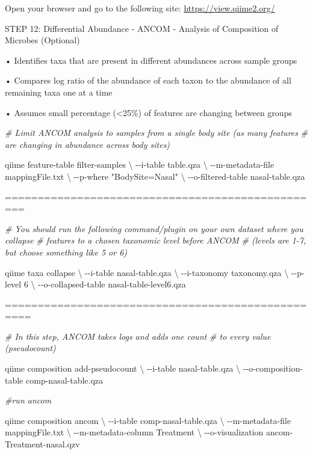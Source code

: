 \documentclass[
]{book}
\newenvironment{Shaded}{\begin{snugshade}}{\end{snugshade}}
\newcommand{\CommentTok}[1]{\textcolor[rgb]{0.56,0.35,0.01}{\textit{#1}}}
\newcommand{\DataTypeTok}[1]{\textcolor[rgb]{0.13,0.29,0.53}{#1}}
\newcommand{\ExtensionTok}[1]{#1}
\newcommand{\NormalTok}[1]{#1}
\newcommand{\StringTok}[1]{\textcolor[rgb]{0.31,0.60,0.02}{#1}}
\begin{document}
Open your browser and go to the following site:
\url{https://view.qiime2.org/}

STEP 12: Differential Abundance - ANCOM - Analysis of Composition of Microbes (Optional)

• Identifies taxa that are present in different abundances across sample groups

• Compares log ratio of the abundance of each taxon to the abundance of all remaining taxa one at a time

• Assumes small percentage (\textless25\%) of features are changing between groups

\begin{Shaded}
\begin{Highlighting}[]
\CommentTok{\# Limit ANCOM analysis to samples from a single body site (as many features }
\CommentTok{\# are changing in abundance across body sites)}

\ExtensionTok{qiime}\NormalTok{ feature{-}table filter{-}samples }\DataTypeTok{\textbackslash{}}
\NormalTok{{-}{-}i{-}table table.qza }\DataTypeTok{\textbackslash{}}
\NormalTok{{-}{-}m{-}metadata{-}file mappingFile.txt }\DataTypeTok{\textbackslash{}}
\NormalTok{{-}{-}p{-}where }\StringTok{"BodySite=\textquotesingle{}Nasal\textquotesingle{}"} \DataTypeTok{\textbackslash{}}
\NormalTok{{-}{-}o{-}filtered{-}table nasal{-}table.qza}

\ExtensionTok{=================================================}

\CommentTok{\# You should run the following command/plugin on your own dataset where you collapse }
\CommentTok{\# features to a chosen taxonomic level before ANCOM }
\CommentTok{\# (levels are 1{-}7, but choose something like 5 or 6)}

\ExtensionTok{qiime}\NormalTok{ taxa collapse }\DataTypeTok{\textbackslash{}}
\NormalTok{{-}{-}i{-}table nasal{-}table.qza }\DataTypeTok{\textbackslash{}}
\NormalTok{{-}{-}i{-}taxonomy taxonomy.qza }\DataTypeTok{\textbackslash{}}
\NormalTok{{-}{-}p{-}level 6 }\DataTypeTok{\textbackslash{}}
\NormalTok{{-}{-}o{-}collapsed{-}table nasal{-}table{-}level6.qza}

\ExtensionTok{==================================================}

\CommentTok{\# In this step, ANCOM takes logs and adds one count }
\CommentTok{\# to every value (pseudocount)}

\ExtensionTok{qiime}\NormalTok{ composition add{-}pseudocount }\DataTypeTok{\textbackslash{}}
\NormalTok{{-}{-}i{-}table nasal{-}table.qza }\DataTypeTok{\textbackslash{}}
\NormalTok{{-}{-}o{-}composition{-}table comp{-}nasal{-}table.qza}

\CommentTok{\#run ancom }

\ExtensionTok{qiime}\NormalTok{ composition ancom }\DataTypeTok{\textbackslash{}}
\NormalTok{{-}{-}i{-}table comp{-}nasal{-}table.qza }\DataTypeTok{\textbackslash{}}
\NormalTok{{-}{-}m{-}metadata{-}file mappingFile.txt }\DataTypeTok{\textbackslash{}}
\NormalTok{{-}{-}m{-}metadata{-}column Treatment }\DataTypeTok{\textbackslash{}}
\NormalTok{{-}{-}o{-}visualization ancom{-}Treatment{-}nasal.qzv}
\end{Highlighting}
\end{Shaded}
\end{document}
